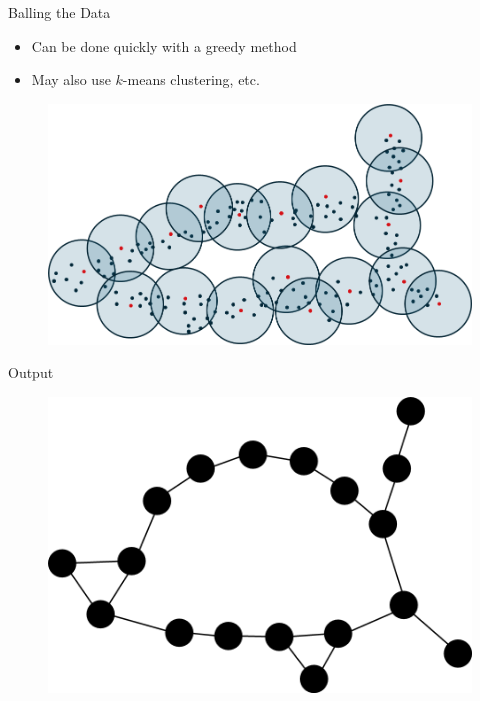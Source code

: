 \documentclass{beamer}
\begin{document}
\begin{frame}{Balling the Data}
  \begin{itemize}
    \item Can be done quickly with a greedy method
    \item May also use $k$-means clustering, etc.
  \end{itemize}
  \begin{figure}
    \begin{center}
      \includegraphics[width=1\textwidth]{ballcover.png}
    \end{center}
  \end{figure}

\end{frame}

\begin{frame}{Output}
  \begin{figure}
    \begin{center}
      \includegraphics[width=1\textwidth]{ballmapperposter.png}
    \end{center}
  \end{figure}
\end{frame}
\end{document}
